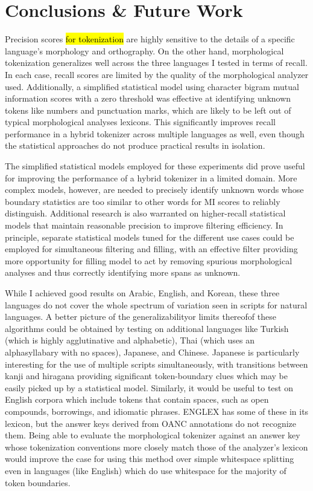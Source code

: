 \chapter{Conclusions \& Future Work}

Precision scores \hl{for tokenization} are highly sensitive to the details of a specific language's morphology and orthography. On the other hand, morphological tokenization generalizes well across the three languages I tested in terms of recall. In each case, recall scores are limited by the quality of the morphological analyzer used. Additionally, a simplified statistical model using character bigram mutual information scores with a zero threshold was effective at identifying unknown tokens like numbers and punctuation marks, which are likely to be left out of typical morphological analyses lexicons. This significantly improves recall performance in a hybrid tokenizer across multiple languages as well, even though the statistical approaches do not produce practical results in isolation.

The simplified statistical models employed for these experiments did prove useful for improving the performance of a hybrid tokenizer in a limited domain. More complex models, however, are needed to precisely identify unknown words whose boundary statistics are too similar to other words for MI scores to reliably distinguish. Additional research is also warranted on higher-recall statistical models that maintain reasonable precision to improve filtering efficiency. In principle, separate statistical models tuned for the different use cases could be employed for simultaneous filtering and filling, with an effective filter providing more opportunity for filling model to act by removing spurious morphological analyses and thus correctly identifying more spans as unknown.

While I achieved good results on Arabic, English, and Korean, these three languages do not cover the whole spectrum of variation seen in scripts for natural languages. A better picture of the generalizability\textemdash or limits thereof\textemdash of these algorithms could be obtained by testing on additional languages like Turkish (which is highly agglutinative and alphabetic), Thai (which uses an alphasyllabary with no spaces), Japanese, and Chinese.
Japanese is particularly interesting for the use of multiple scripts simultaneously, with transitions between kanji and hiragana providing significant token-boundary clues which may be easily picked up by a statistical model. Similarly, it would be useful to test on English corpora which include tokens that contain spaces, such as open compounds, borrowings, and idiomatic phrases. ENGLEX has some of these in its lexicon, but the answer keys derived from OANC annotations do not recognize them. Being able to evaluate the morphological tokenizer against an answer key whose tokenization conventions more closely match those of the analyzer's lexicon would improve the case for using this method over simple whitespace splitting even in languages (like English) which do use whitespace for the majority of token boundaries.

